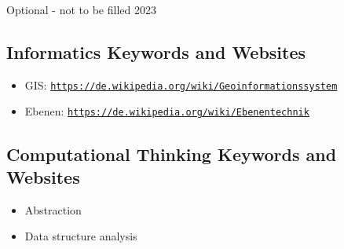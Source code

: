 \documentclass[a4paper,11pt]{report}
\newcommand{\BrochureUrlText}[1]{\texttt{#1}}
\begin{document}
Optional - not to be filled 2023


\subsection*{Informatics Keywords and Websites}

\begin{itemize}
  \item GIS: \href{https://de.wikipedia.org/wiki/Geoinformationssystem}{\BrochureUrlText{https://de.wikipedia.org/wiki/Geoinformationssystem}}
  \item Ebenen: \href{https://de.wikipedia.org/wiki/Ebenentechnik}{\BrochureUrlText{https://de.wikipedia.org/wiki/Ebenentechnik}}
\end{itemize}


\subsection*{Computational Thinking Keywords and Websites}

\begin{itemize}
  \item Abstraction
  \item Data structure analysis
\end{itemize}
\end{document}
